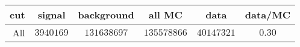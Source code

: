 \begin{tabular}{r|c|c|c|c|c}
cut&signal&background&all MC&data&data/MC\\
\hline
All&$3940169$&$131638697$&$135578866$&$40147321$&$0.30$\\
\end{tabular}
